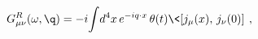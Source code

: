 \begin{equation}\label{GRcurrent}
  G^R_{\mu\nu} (\omega, \q) = -i\!\int\!d^4x\,e^{-iq\cdot x}\,
  \theta(t) \< [j_\mu(x),\, j_\nu(0)] \>\,,
\end{equation}

